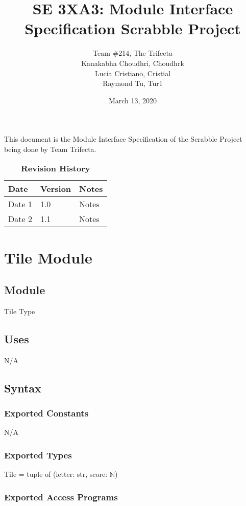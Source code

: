 \documentclass[12pt]{article}
\title{SE 3XA3: Module Interface Specification Scrabble Project}
\author{Team \#214, The Trifecta
		\\ Kanakabha Choudhri, Choudhrk
		\\ Lucia Cristiano, Cristial
		\\ Raymond Tu, Tur1
}
\date{March 13, 2020}
\begin{document}
 
\maketitle

This document is the Module Interface Specification of the Scrabble Project being done by Team Trifecta. 

\begin{table}[bp]
\caption{\bf Revision History}
\begin{tabularx}{\textwidth}{p{3cm}p{2cm}X}
\toprule {\bf Date} & {\bf Version} & {\bf Notes}\\
\midrule
Date 1 & 1.0 & Notes\\
Date 2 & 1.1 & Notes\\
\bottomrule
\end{tabularx}
\end{table}

\newpage

\section* {Tile Module}

\subsection*{Module}

Tile Type

\subsection* {Uses}
N/A

\subsection* {Syntax}

\subsubsection* {Exported Constants}
N/A
\subsubsection* {Exported Types}
Tile = tuple of (letter: str, score: $\mathbb{N}$)

\subsubsection* {Exported Access Programs}
\end{document}
